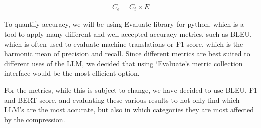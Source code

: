 \vspace*{-0.7cm}
\begin{align}
    C_{e} = C_{i} \times E
    \label{eq:CO2-emissions}
\end{align}
\vspace*{-0.6cm}

To quantify accuracy, we will be using Evaluate  library for python, which is a tool to apply many different and well-accepted accuracy metrics, such as BLEU, which is often used to evaluate machine-translations or F1 score, which is the harmonic mean of precision and recall. Since different metrics are best suited to different uses of the LLM, we decided that using ‘Evaluate’s metric collection interface would be the most efficient option. 
	
For the metrics, while this is subject to change, we have decided to use BLEU, F1 and BERT-score, and evaluating these various results to not only find which LLM’s are the most accurate, but also in which categories they are most affected by the compression.


